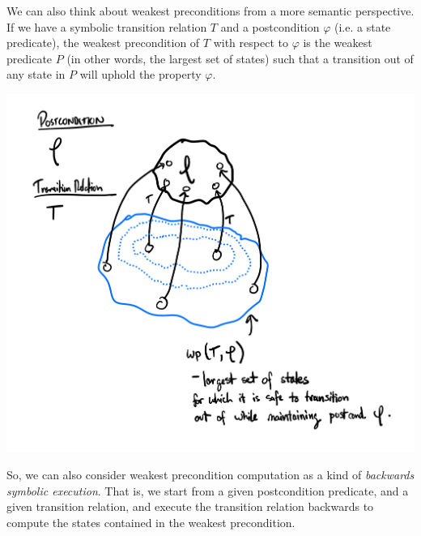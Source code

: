\documentclass[10pt,a4paper]{article}
\begin{document}
We can also think about weakest preconditions from a more semantic perspective. If we have a symbolic transition relation $T$ and a postcondition $\varphi$ (i.e. a state predicate), the weakest precondition of $T$ with respect to $\varphi$ is the weakest predicate $P$ (in other words, the largest set of states) such that a transition out of any state in $P$ will uphold the property $\varphi$.
\begin{center}
    \includegraphics[scale=0.18]{weakest_precond.png}
\end{center}
So, we can also consider weakest precondition computation as a kind of \textit{backwards symbolic execution}. That is, we start from a given postcondition predicate, and a given transition relation, and execute the transition relation backwards to compute the states contained in the weakest precondition.




\end{document}
